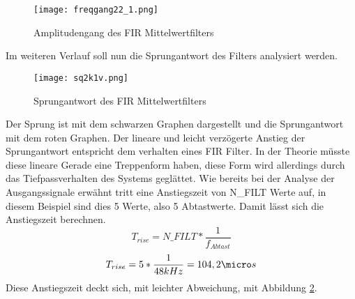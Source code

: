 \begin{figure}[H]
  \centering
    \texttt{[image: freqgang22\_1.png]}
  \caption{Amplitudengang des FIR Mittelwertfilters}
  \label{fig:AmpgangFIRMit}
\end{figure}
Im weiteren Verlauf soll nun die Sprungantwort des Filters analysiert werden.
\begin{figure}[H]
  \centering
    \texttt{[image: sq2k1v.png]}
  \caption{Sprungantwort des FIR Mittelwertfilters}
  \label{fig:SprungFIRMit}
\end{figure}
Der Sprung ist mit dem schwarzen Graphen dargestellt und die Sprungantwort mit dem 
roten Graphen. Der lineare und leicht verzögerte Anstieg der Sprungantwort 
entspricht dem verhalten eines FIR Filter. In der Theorie m\"usste diese lineare 
Gerade eine Treppenform haben, diese Form wird allerdings durch das Tiefpassverhalten 
des Systems gegl\"attet. Wie bereits bei der Analyse der Ausgangssignale 
erw\"ahnt tritt eine Anstiegszeit von N\_FILT Werte auf, in diesem 
Beispiel sind dies 5 Werte, also 5 Abtastwerte. Damit lässt sich die 
Anstiegszeit berechnen.
\begin{equation}
  T_{rise} = N\_FILT * \frac{1}{f_{Abtast}}
\end{equation}
\begin{equation*}
  T_{rise} = 5* \frac{1}{48 kHz} = 104,2\micro s
\end{equation*}
Diese Anstiegszeit deckt sich, mit leichter Abweichung, mit Abbildung 
\ref{fig:SprungFIRMit}.

